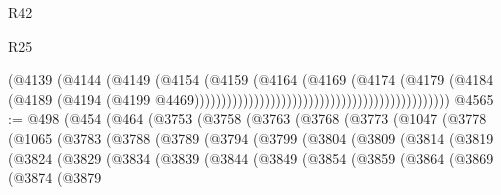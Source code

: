 \begin{lexlean}{R42}
\begin{lexlean}{R25}
\begin{coremodule}
{{{{{{{{{{{{{{{{{{{{{{{{{{{{{{{{{{{{{{{{{{{{{{{{{{{{{{{{{{{{{{{{{{{{{{{{{{{{{{{{{{{{{{{{{{{{{{{{{{{{{{{{{{{{{{{{{{{{{{{{{{{{{{{{{{{{{{{{{{{{{{{{{{{{{{{{{{{{{{{{{{{{{{{{{{{{{{{{{{{{{{{{{{{{{{{{{{{{{{{                                                                        (@4139
                                                                          (@4144
                                                                            (@4149
                                                                              (@4154
                                                                                (@4159
                                                                                  (@4164
                                                                                    (@4169
                                                                                      (@4174
                                                                                        (@4179
                                                                                          (@4184
                                                                                            (@4189
                                                                                              (@4194
                                                                                                (@4199
                                                                                                  @4469)))))))))))))))))))))))))))))))))))))))))))))))
@4565 := @498
    (@454
      (@464
        (@3753
          (@3758
            (@3763
              (@3768
                (@3773
                  (@1047
                    (@3778
                      (@1065
                        (@3783
                          (@3788
                            (@3789
                              (@3794
                                (@3799
                                  (@3804
                                    (@3809
                                      (@3814
                                        (@3819
                                          (@3824
                                            (@3829
                                              (@3834
                                                (@3839
                                                  (@3844
                                                    (@3849
                                                      (@3854
                                                        (@3859
                                                          (@3864
                                                            (@3869
                                                              (@3874
                                                                (@3879
}}}}}}}}}}}}}}}}}}}}}}}}}}}}}}}}}}}}}}}}}}}}}}}}}}}}}}}}}}}}}}}}}}}}}}}}}}}}}}}}}}}}}}}}}}}}}}}}}}}}}}}}}}}}}}}}}}}}}}}}}}}}}}}}}}}}}}}}}}}}}}}}}}}}}}}}}}}}}}}}}}}}}}}}}}}}}}}}}}}}}}}}}}}}}}}}}}}}}}}
\end{coremodule}
\end{lexlean}
\end{lexlean}
